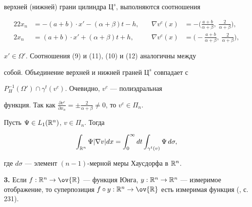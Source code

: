 верхней (нижней) грани цилиндра $Ц^s$, выполняются соотношения 


\begin{alignat}{2} 


2x_n&=-(a+b)\cdot x'-(\alpha+\beta)t-h, &\quad 


\nabla v^c(x)&=-\bigg(\frac{a+b}{\alpha+\beta},\ \frac{2}{\alpha+\beta} 


\bigg), \\ 


2x_n&=(a+b)\cdot x'+(\alpha+\beta)t+h, &\quad  


\nabla v^c(x)&=\bigg(-\frac{a+b}{\alpha+\beta},\ \frac{2}{\alpha+\beta} 


\bigg), 


\end{alignat} 


$x'\in\Omega'$. Соотношения (9) и (11), (10) и (12) аналогичны между 


собой. Объединение верхней и нижней граней $Ц^s$ совпадает с 


$P^{-1}_H(\Omega')\cap\gamma^t(v^c)$. Очевидно, $v^c$ --- полиэдральная 


функция. Так как $\frac{\partial v^c}{\partial 


x_n}=\pm\frac{2}{\alpha+\beta}\ne 0$, то $v^c\in \Pi_n$. 


 


\begin{prop} 


Пусть $\Psi\in L_1(\Bbb R^n)$, $v\in\Pi_n$. Тогда 


\begin{equation} 


\int_{\Bbb R^n}\Psi|\nabla v|dx=\int^\infty_0dt\int_{\gamma^t(v)} 


\Psi\,d\sigma, 


\end{equation} 


где $d\sigma$ --- элемент $(n-1)$-мерной меры Хаусдорфа в $\Bbb R^n$. 


\end{prop} 


 


{\bf 3.} Если $f:\Bbb R^n\to\ov{\Bbb R}$ --- функция Юнга, $y:\Bbb 


R^n\to\Bbb R^n$ --- измеримое отображение, то суперпозиция $f\circ 


y:\Bbb R^n\to\ov{\Bbb R}$ есть измеримая функция (\cite{8}, с.\,231). 



